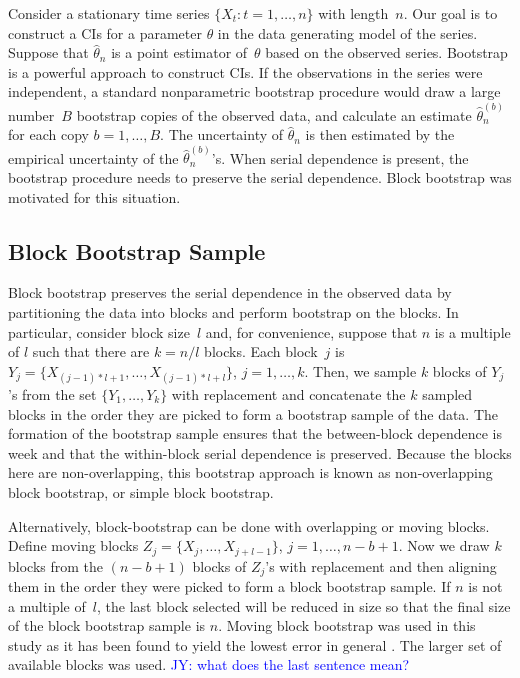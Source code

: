 \documentclass[12pt, letterpaper, titlepage]{article}
\newcommand{\jy}[1]{\textcolor{blue}{JY: #1}}
\begin{document}
Consider a stationary time series $\{X_t: t = 1, \ldots, n\}$ with length~$n$.
Our goal is to construct a CIs for a parameter $\theta$ in the
data generating model of the series. Suppose that $\hat\theta_n$ is a point
estimator of~$\theta$ based on the observed series. Bootstrap is a powerful
approach to construct CIs. If the observations in the series
were independent, a standard nonparametric bootstrap procedure would draw a
large number~$B$ bootstrap copies of the observed data, and calculate an
estimate $\hat\theta_n^{(b)}$ for each copy $b = 1, \ldots, B$. The uncertainty
of $\hat\theta_n$ is then estimated by the empirical uncertainty of the
$\hat\theta_n^{(b)}$'s. When serial dependence is present, the bootstrap
procedure needs to preserve the serial dependence. Block bootstrap was
motivated for this situation. 


\subsection{Block Bootstrap Sample}

Block bootstrap preserves the serial dependence in the observed data by
partitioning the data into blocks and perform bootstrap on the blocks.
In particular, consider block size~$l$ and, for convenience, suppose that
$n$ is a multiple of $l$ such that there are $k = n / l$ blocks. Each block~$j$
is $Y_j = \{X_{(j - 1) * l + 1}, \ldots, X_{(j - 1) * l + l}\}$,
$j = 1, \ldots,   k$.  Then, we sample $k$ blocks of $Y_j$'s from the set 
$\{Y_1, \ldots, Y_k\}$ with replacement and concatenate the $k$ sampled blocks
in the order they are picked to form a bootstrap sample of the data. The
formation of the bootstrap sample ensures that the between-block dependence is
week and that the within-block serial dependence is preserved. Because the
blocks here are non-overlapping, this bootstrap approach is known as
non-overlapping block bootstrap, or simple block bootstrap.


Alternatively, block-bootstrap can be done with overlapping or moving blocks.
Define moving blocks $Z_j = \{X_j, \ldots, X_{j + l - 1}\}$,
$j = 1, \ldots, n - b + 1$. Now we draw $k$ blocks from the $(n - b + 1)$ blocks
of $Z_j$'s with replacement and then aligning them in the order they were picked
to form a block bootstrap sample. If $n$ is not a multiple of~$l$, the last
block selected will be reduced in size so that the final size of the
block bootstrap sample is $n$. Moving block bootstrap was used in
this study as it has been found to yield the lowest error in general
\citep{radovanov2014comparison}. The larger set of available blocks was used.
\jy{what does the last sentence mean?}
\end{document}
